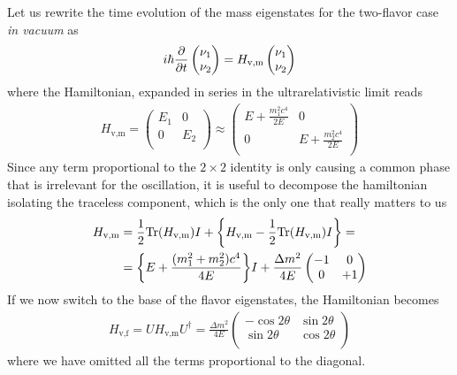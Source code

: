 Let us rewrite the time evolution of the mass eigenstates for the two-flavor case
\emph{in vacuum} as
\begin{align*}
  i\hbar \pdv{t} \begin{pmatrix}\nu_1\\ \nu_2 \end{pmatrix} =
  H_\text{v,m} \begin{pmatrix}\nu_1\\ \nu_2 \end{pmatrix}
\end{align*}
where the Hamiltonian, expanded in series in the ultrarelativistic limit reads
\begin{align*}
  H_\text{v,m} =
  \begin{pmatrix}
  E_1 & 0\\
  0 & E_2\\
  \end{pmatrix} \approx
  \begin{pmatrix}
  E + \frac{m_1^2 c^4}{2E} & 0\\
  0 & E + \frac{m_2^2 c^4}{2E}\\
  \end{pmatrix}
\end{align*}
Since any term proportional to the $2 \times 2$ identity is only causing a common
phase that is irrelevant for the oscillation, it is useful to decompose the hamiltonian
isolating the traceless component, which is the only one that really matters to us
\begin{align*}
  H_\text{v,m} & =
  \frac{1}{2}\text{Tr}(H_\text{v,m}) I  + \qty{H_\text{v,m} -
  \frac{1}{2}\text{Tr}(H_\text{v,m}) I} =\\
  & = \qty{E + \frac{(m_1^2 + m_2^2)c^4}{4E}} I +
  \frac{\Delta m^2}{4E}
  \begin{pmatrix}
    -1 & 0\\
    0 & +1\\
  \end{pmatrix}
\end{align*}
If we now switch to the base of the flavor eigenstates, the Hamiltonian becomes
\begin{align*}
  H_\text{v,f} = U H_\text{v,m} U^\dag = \frac{\Delta m^2}{4E}
  \begin{pmatrix}
   -\cos2\theta & \sin2\theta\\
   \sin2\theta & \cos2\theta\\
  \end{pmatrix}
\end{align*}
where we have omitted all the terms proportional to the diagonal.

